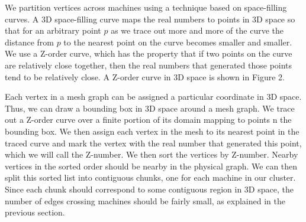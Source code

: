 
We partition vertices across machines using a technique 
based on space-filling curves. A 3D space-filling curve 
maps the real numbers to points in 3D space so that for 
an arbitrary point $p$ as we trace out more and more of 
the curve the distance from $p$ to the nearest point on 
the curve becomes smaller and smaller. We use a Z-order 
curve, which has the property that if two points on the 
curve are relatively close together, then the real numbers 
that generated those points tend to be relatively close. A 
Z-order curve in 3D space is shown in Figure 2.

Each vertex in a mesh graph can be assigned a particular 
coordinate in 3D space. Thus, we can draw a bounding box 
in 3D space around a mesh graph. We trace out a Z-order 
curve over a finite portion of its domain mapping to points 
n the bounding box. We then assign each vertex in the mesh 
to its nearest point in the traced curve and mark the vertex 
with the real number that generated this point, which we will 
call the Z-number. We then sort the vertices by Z-number. 
Nearby vertices in the sorted order should be nearby in the 
physical graph. We can then split this sorted list into 
contiguous chunks, one for each machine in our cluster. 
Since each chunk should correspond to some contiguous 
region in 3D space, the number of edges crossing machines 
should be fairly small, as explained in the previous section.
